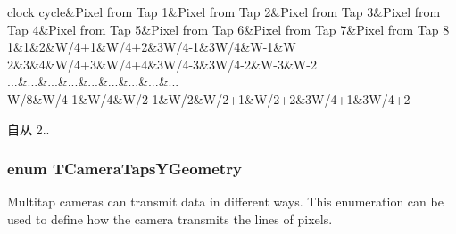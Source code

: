 \begin{Desc}
\begin{description}
\begin{TabularC}{9}
\hline
clock cycle&Pixel from Tap 1&Pixel from Tap 2&Pixel from Tap 3&Pixel from Tap 4&Pixel from Tap 5&Pixel from Tap 6&Pixel from Tap 7&Pixel from Tap 8 \\
1&1&2&W/4+1&W/4+2&3\+W/4-\/1&3\+W/4&W-\/1&W \\
2&3&4&W/4+3&W/4+4&3\+W/4-\/3&3\+W/4-\/2&W-\/3&W-\/2 \\
...&...&...&...&...&...&...&...&... \\
W/8&W/4-\/1&W/4&W/2-\/1&W/2&W/2+1&W/2+2&3\+W/4+1&3\+W/4+2 \\
\end{TabularC}


\begin{DoxySince}{自从}
2.. 
\end{DoxySince}
\end{description}
\end{Desc}
\hypertarget{group___device_specific_interface_ga03c8b70bb46d82e4f9f4a8c154d7261c}{
\subsubsection[{T\+Camera\+Taps\+Y\+Geometry}]{\setlength{\rightskip}{0pt plus 5cm}enum {\bf T\+Camera\+Taps\+Y\+Geometry}}}\label{group___device_specific_interface_ga03c8b70bb46d82e4f9f4a8c154d7261c}


Multitap cameras can transmit data in different ways. This enumeration can be used to define how the camera transmits the lines of pixels. 

